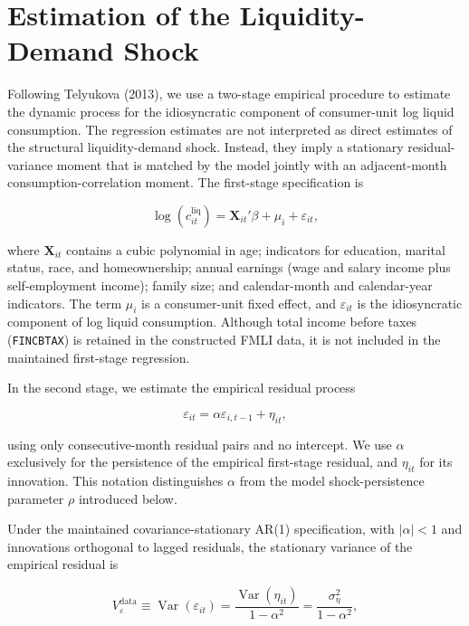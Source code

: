 \documentclass[11pt]{article}
\begin{document}
\section{Estimation of the Liquidity-Demand Shock}

Following Telyukova (2013), we use a two-stage empirical procedure to estimate the dynamic process for the idiosyncratic component of consumer-unit log liquid consumption. The regression estimates are not interpreted as direct estimates of the structural liquidity-demand shock. Instead, they imply a stationary residual-variance moment that is matched by the model jointly with an adjacent-month consumption-correlation moment. The first-stage specification is

\begin{equation}
	\label{eqn:telyukova_first_stage}
	\log(c^{\mathrm{liq}}_{it})
	= \mathbf{X}_{it}'\beta + \mu_i + \varepsilon_{it},
\end{equation}

where $\mathbf{X}_{it}$ contains a cubic polynomial in age; indicators for education, marital status, race, and homeownership; annual earnings (wage and salary income plus self-employment income); family size; and calendar-month and calendar-year indicators. The term $\mu_i$ is a consumer-unit fixed effect, and $\varepsilon_{it}$ is the idiosyncratic component of log liquid consumption. Although total income before taxes (\lstinline|FINCBTAX|) is retained in the constructed FMLI data, it is not included in the maintained first-stage regression.

In the second stage, we estimate the empirical residual process

\begin{equation}
	\label{eqn:telyukova_second_stage}
	\varepsilon_{it}
	= \alpha \varepsilon_{i,t-1} + \eta_{it},
\end{equation}

using only consecutive-month residual pairs and no intercept. We use $\alpha$ exclusively for the persistence of the empirical first-stage residual, and $\eta_{it}$ for its innovation. This notation distinguishes $\alpha$ from the model shock-persistence parameter $\rho$ introduced below.

Under the maintained covariance-stationary AR(1) specification, with $|\alpha|<1$ and innovations orthogonal to lagged residuals, the stationary variance of the empirical residual is

\begin{equation}
	\label{eqn:empirical_residual_variance}
	V_{\varepsilon}^{\mathrm{data}}
	\equiv \operatorname{Var}(\varepsilon_{it})
	= \frac{\operatorname{Var}(\eta_{it})}{1-\alpha^2}
	= \frac{\sigma_\eta^2}{1-\alpha^2},
\end{equation}
\end{document}
